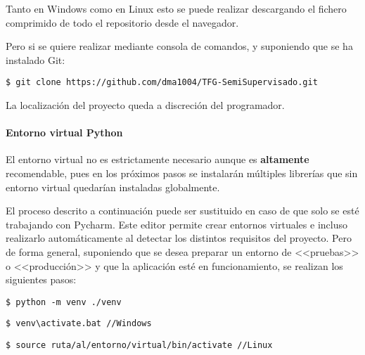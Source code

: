 Tanto en Windows como en Linux esto se puede realizar descargando el fichero
comprimido de todo el repositorio desde el navegador.

Pero si se quiere realizar mediante consola de comandos, y suponiendo que se ha
instalado Git:

\begin{tcolorbox}[colback=cyan!5!white,colframe=cyan!75!black,fontupper=\footnotesize,title=Clonación de repositorio desde consola]
\begin{verbatim}
$ git clone https://github.com/dma1004/TFG-SemiSupervisado.git
\end{verbatim}
\end{tcolorbox}
La localización del proyecto queda a discreción del programador.

\paragraph{Entorno virtual Python} El entorno virtual no es estrictamente
necesario aunque es \textbf{altamente} recomendable, pues en los próximos pasos
se instalarán múltiples librerías que sin entorno virtual quedarían instaladas
globalmente.

El proceso descrito a continuación puede ser sustituido en caso de que solo se
esté trabajando con Pycharm. Este editor permite crear entornos virtuales e
incluso realizarlo automáticamente al detectar los distintos requisitos del
proyecto. Pero de forma general, suponiendo que se desea preparar un entorno de
<<pruebas>> o <<producción>> y que la aplicación esté en funcionamiento, se
realizan los siguientes pasos:

\begin{tcolorbox}[colback=cyan!5!white,colframe=orange!75!black,title=Creación del entorno virtual (dentro de la carpeta deseado)]
\begin{verbatim}
$ python -m venv ./venv
\end{verbatim}
\end{tcolorbox}


\begin{tcolorbox}[colback=cyan!5!white,colframe=cyan!75!black,fontupper=\footnotesize,fontlower=\footnotesize,title=Activación del entorno virtual]
\begin{verbatim}
$ venv\activate.bat //Windows
\end{verbatim}
\tcblower
\begin{verbatim}
$ source ruta/al/entorno/virtual/bin/activate //Linux
\end{verbatim}
\end{tcolorbox}

